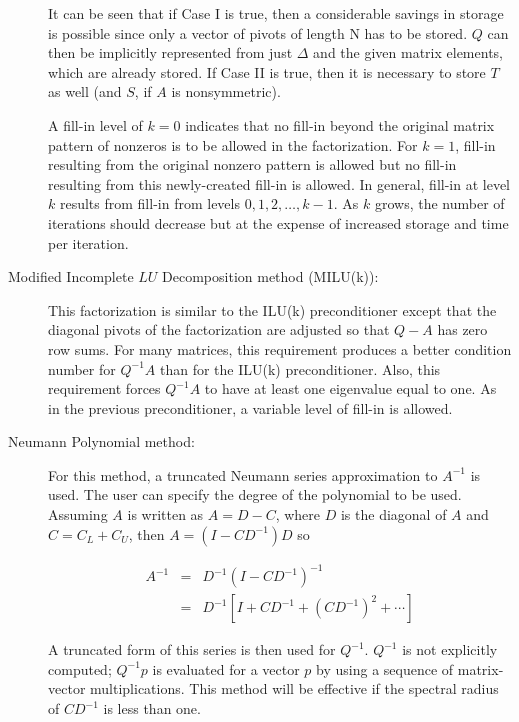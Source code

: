 \begin{description}
      It can be seen that if Case I is true, then a considerable
      savings in storage is possible since only a vector of pivots
      of length N has to be stored.  $Q$ can then be implicitly
      represented from just $\Delta$ and the given matrix elements,
      which are already stored.  If Case II is true, then
      it is necessary to store $T$ as well (and $S$, if $A$ is
      nonsymmetric).
 
      A fill-in level of $k=0$ indicates that no fill-in beyond
      the original matrix pattern of nonzeros is to be allowed
      in the factorization.  For $k=1$, fill-in resulting from
      the original nonzero pattern is allowed but no fill-in
      resulting from this newly-created fill-in is allowed.  In
      general, fill-in at level $k$ results from fill-in from levels
      $0,1,2, \ldots, k-1.$  As $k$ grows, the number of
      iterations should decrease but at the expense of increased
      storage and time per iteration.
 
\item[Modified Incomplete $LU$ Decomposition method (MILU(k)):]
      This factorization is similar to the \newline ILU(k) preconditioner
      except that the diagonal pivots of the factorization are
      adjusted so that $Q-A$ has zero row sums.  For many matrices,
      this requirement produces a better condition number for
      $Q^{-1}A$ than for the ILU(k) preconditioner.  Also, this
      requirement forces $Q^{-1}A$ to have at least one eigenvalue
      equal to one.  As in the previous preconditioner, a variable 
      level of fill-in is allowed.
 
\item[Neumann Polynomial method:]
      For this method, a truncated Neumann series approximation
      to $A^{-1}$ is used.  The user can specify the degree of the
      polynomial to be used.  Assuming $A$ is written as $A=D-C$,
      where $D$ is the diagonal of $A$ and $C=C_L+C_U$, 
      then $A=(I-CD^{-1})D$  so
 
\begin{eqnarray*}
        A^{-1} & = & D^{-1}(I-CD^{-1})^{-1} \\
               & = & D^{-1}[I+CD^{-1}+(CD^{-1})^2 + \cdots ]
\end{eqnarray*}
 
      A truncated form of this series is then used for $Q^{-1}$.
      $Q^{-1}$ is not explicitly computed; $Q^{-1}p$ is
      evaluated for a vector $p$ by using a sequence of matrix-vector
      multiplications.  This method will be effective if the spectral 
      radius of $CD^{-1}$ is less than one.
 

\end{description}
